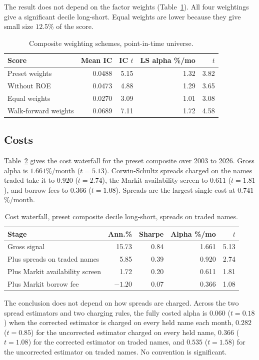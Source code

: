 \documentclass[11pt,a4paper]{article}
\begin{document}
The result does not depend on the factor weights (Table~\ref{tab:wt}). All four weightings give a significant decile long-short. Equal weights are lower because they give small size $12.5$\% of the score.

\begin{table}[h]
\centering
\caption{Composite weighting schemes, point-in-time universe.}
\label{tab:wt}
\begin{tabular}{lrrrr}
\toprule
Score & Mean IC & IC $t$ & LS alpha \%/mo & $t$ \\
\midrule
Preset weights & 0.0488 & 5.15 & 1.32 & 3.82 \\
Without ROE & 0.0473 & 4.88 & 1.29 & 3.65 \\
Equal weights & 0.0270 & 3.09 & 1.01 & 3.08 \\
Walk-forward weights & 0.0689 & 7.11 & 1.72 & 4.58 \\
\bottomrule
\end{tabular}
\end{table}

\subsection{Costs}
Table~\ref{tab:wf} gives the cost waterfall for the preset composite over 2003 to 2026. Gross alpha is $1.661$\%/month ($t=5.13$). Corwin-Schultz spreads charged on the names traded take it to $0.920$ ($t=2.74$), the Markit availability screen to $0.611$ ($t=1.81$), and borrow fees to $0.366$ ($t=1.08$). Spreads are the largest single cost at $0.741$\%/month.

\begin{table}[h]
\centering
\caption{Cost waterfall, preset composite decile long-short, spreads on traded names.}
\label{tab:wf}
\begin{tabular}{lrrrr}
\toprule
Stage & Ann.\% & Sharpe & Alpha \%/mo & $t$ \\
\midrule
Gross signal & 15.73 & 0.84 & 1.661 & 5.13 \\
Plus spreads on traded names & 5.85 & 0.39 & 0.920 & 2.74 \\
Plus Markit availability screen & 1.72 & 0.20 & 0.611 & 1.81 \\
Plus Markit borrow fee & $-1.20$ & 0.07 & 0.366 & 1.08 \\
\bottomrule
\end{tabular}
\end{table}

The conclusion does not depend on how spreads are charged. Across the two spread estimators and two charging rules, the fully costed alpha is $0.060$ ($t=0.18$) when the corrected estimator is charged on every held name each month, $0.282$ ($t=0.85$) for the uncorrected estimator charged on every held name, $0.366$ ($t=1.08$) for the corrected estimator on traded names, and $0.535$ ($t=1.58$) for the uncorrected estimator on traded names. No convention is significant.
\end{document}
